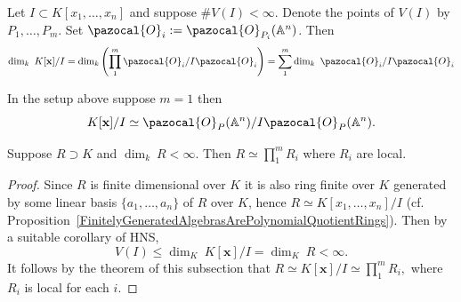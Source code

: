   \begin{corollary}\label{DimensionOfLocalQuotientFromIdealsWithFiniteZeroes}
        Let $I\subset K[x_1,\dots,x_n]$ and suppose $\#V(I)< \infty$. Denote the points of $V(I)$ by $P_1,\dots,P_m$. Set $\pazocal{O}_i:=\pazocal{O}_{P_i}(\A^n)$. Then
        $$\dim_k \ K[\mathbf{x}]/I = \dim_k\left( \prod_1^m \pazocal{O}_i/I\pazocal{O}_i\right)= \sum_1^m \dim_k \ \pazocal{O}_i/I\pazocal{O}_i$$
  \end{corollary}
  \begin{corollary}
        In the setup above suppose $m=1$ then 
        $$K[\mathbf{x}]/I\simeq \pazocal{O}_P(\A^n)/I\pazocal{O}_P(\A^n).$$
  \end{corollary}
  \begin{corollary}\label{FiniteDimensionalAlgebrasIsAFiniteProductOfLocalRings}
      Suppose $R\supset K$ and $\dim_k\ R < \infty$. Then $R\simeq \prod_1^m R_i$ where $R_i$ are local. 
  \end{corollary}
  \begin{proof}
       Since $R$ is finite dimensional over $K$ it is also ring finite over $K$ generated by some linear basis $\{a_1,\dots,a_n\}$ of $R$ over $K$, hence $R\simeq K[x_1,\dots, x_n]/I$ (cf. Proposition~\ref{FinitelyGeneratedAlgebrasArePolynomialQuotientRings}). Then by a suitable corollary of HNS, $$V(I)\leq \dim_K\ K[\mathbf{x}]/I=  \dim_K \ R<\infty.$$
       It follows by the theorem of this subsection that $R\simeq K[\mathbf{x}]/I \simeq \prod_1^m R_i,$
       where $R_i$ is local for each $i$.
  \end{proof}
